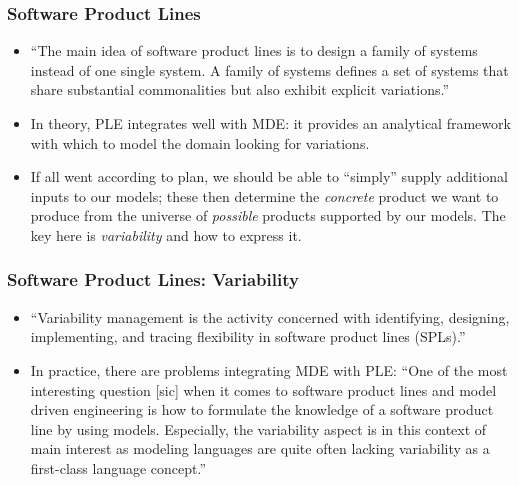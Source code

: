 \documentclass{beamer}
\begin{document}
\begin{frame}
\frametitle{Software Product Lines}

\begin{itemize}

\item ``The main idea of software product lines is to design a family
  of systems instead of one single system. A family of systems defines
  a set of systems that share substantial commonalities but also
  exhibit explicit variations.''\cite{brambilla2012model}

\pause

\item In theory, \ac{PLE} integrates well with \ac{MDE}: it provides
  an analytical framework with which to model the domain looking for
  variations.

\pause

\item If all went according to plan, we should be able to ``simply''
  supply additional inputs to our models; these then determine the
  \emph{concrete} product we want to produce from the universe of
  \emph{possible} products supported by our models. The key here is
  \emph{variability} and how to express it.

\end{itemize}

\end{frame}

\begin{frame}
\frametitle{Software Product Lines: Variability}

\begin{itemize}

\item ``Variability management is the activity concerned with
  identifying, designing, implementing, and tracing flexibility in
  software product lines (SPLs).''

\pause

\item In practice, there are problems integrating \ac{MDE} with
  \ac{PLE}: ``One of the most interesting question [sic] when it comes
  to software product lines and model driven engineering is how to
  formulate the knowledge of a software product line by using
  models. Especially, the variability aspect is in this context of
  main interest as modeling languages are quite often lacking
  variability as a first-class language
  concept.''\cite{brambilla2012model}

\end{itemize}

\end{frame}
\end{document}
